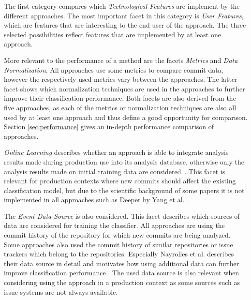 The first category compares which \textit{Technological Features} are implement by the different approaches. The most important facet in this category is \textit{User Features}, which are features that are interesting to the end user of the approach. The three selected possibilities reflect features that are implemented by at least one approach.

More relevant to the performance of a method are the facets \textit{Metrics} and \textit{Data Normalization}. All approaches use some metrics to compare commit data, however the respectively used metrics vary between the approaches.
The latter facet shows which normalization techniques are used in the approaches to further improve their classification performance.
Both facets are also derived from the five approaches, as each of the metrics or normalization techniques are also all used by at least one approach and thus define a good opportunity for comparison. Section \ref{sec:performance} gives an in-depth performance comparison of approaches.

\textit{Online Learning} describes whether an approach is able to integrate analysis results made during production use into its analysis database, otherwise only the analysis results made on initial training data are considered~\cite{MAL-018}. This facet is relevant for production contexts where new commits should affect the existing classification model, but due to the scientific background of some papers it is not implemented in all approaches such as Deeper by Yang et al.~\cite{Yang2015}.

The \textit{Event Data Source} is also considered. This facet describes which sources of data are considered for training the classifier. All approaches are using the commit history of the repository for which new commits are being analyzed. Some approaches also used the commit history of similar repositories or issue trackers which belong to the repositories.
Especially Nayrolles et al. describes their data source in detail and motivates how using additional data can further improve classification performance \cite{Nayrolles2018}. The used data source is also relevant when considering using the approach in a production context as some sources such as issue systems are not always available. 

